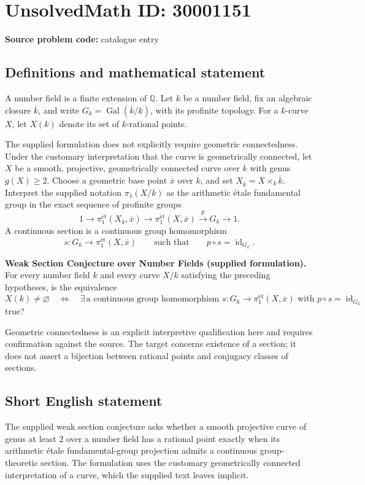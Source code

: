 \documentclass[11pt]{article}
\newcommand{\Q}{\mathbb{Q}}
\begin{document}
\section*{UnsolvedMath ID: 30001151}
\textbf{Source problem code:} catalogue entry
\subsection{Definitions and mathematical statement}
A number field is a finite extension of \(\Q\). Let \(k\) be a number field, fix an algebraic closure \(\overline{k}\), and write \(G_k=\operatorname{Gal}(\overline{k}/k)\), with its profinite topology. For a \(k\)-curve \(X\), let \(X(k)\) denote its set of \(k\)-rational points.

The supplied formulation does not explicitly require geometric connectedness. Under the customary interpretation that the curve is geometrically connected, let \(X\) be a smooth, projective, geometrically connected curve over \(k\) with genus \(g(X)\geq 2\). Choose a geometric base point \(\overline{x}\) over \(\overline{k}\), and set \(X_{\overline{k}}=X\times_k\overline{k}\). Interpret the supplied notation \(\pi_1(X/k)\) as the arithmetic étale fundamental group in the exact sequence of profinite groups
\[
1\longrightarrow\pi_1^{\mathrm{\acute{e}t}}(X_{\overline{k}},\overline{x})
\longrightarrow\pi_1^{\mathrm{\acute{e}t}}(X,\overline{x})
\xrightarrow{p}G_k\longrightarrow 1.
\]
A continuous section is a continuous group homomorphism
\[
s:G_k\longrightarrow\pi_1^{\mathrm{\acute{e}t}}(X,\overline{x})
\qquad\text{such that}\qquad p\circ s=\operatorname{id}_{G_k}.
\]

\textbf{Weak Section Conjecture over Number Fields (supplied formulation).} For every number field \(k\) and every curve \(X/k\) satisfying the preceding hypotheses, is the equivalence
\[
X(k)\neq\varnothing
\quad\Longleftrightarrow\quad
\exists\,\text{a continuous group homomorphism }s:G_k\to\pi_1^{\mathrm{\acute{e}t}}(X,\overline{x})
\text{ with }p\circ s=\operatorname{id}_{G_k}
\]
true?

Geometric connectedness is an explicit interpretive qualification here and requires confirmation against the source. The target concerns existence of a section; it does not assert a bijection between rational points and conjugacy classes of sections.
\subsection{Short English statement}
The supplied weak section conjecture asks whether a smooth projective curve of genus at least \(2\) over a number field has a rational point exactly when its arithmetic étale fundamental-group projection admits a continuous group-theoretic section. The formulation uses the customary geometrically connected interpretation of a curve, which the supplied text leaves implicit.
\end{document}
